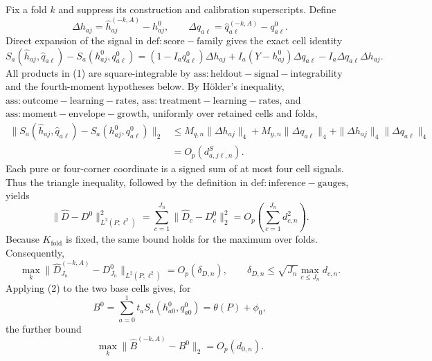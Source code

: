 Fix a fold \(k\) and suppress its construction and calibration superscripts.  Define
\[
 \Delta h_{aj}=\widehat h_{aj}^{(-k,A)}-h^0_{aj},\qquad
 \Delta q_{a\ell}=\widehat q_{a\ell}^{(-k,A)}-q^0_{a\ell}.
\]
Direct expansion of the signal in \(\mathrm{def:score-family}\) gives the exact cell identity
\[
 S_a(\widehat h_{aj},\widehat q_{a\ell})-S_a(h^0_{aj},q^0_{a\ell})
 =(1-I_aq^0_{a\ell})\Delta h_{aj}
 +I_a(Y-h^0_{aj})\Delta q_{a\ell}
 -I_a\Delta q_{a\ell}\Delta h_{aj}.                                      \tag{1}
\]
All products in (1) are square-integrable by \(\mathrm{ass:heldout-signal-integrability}\) and the fourth-moment hypotheses below.  By H\"older's inequality, \(\mathrm{ass:outcome-learning-rates}\), \(\mathrm{ass:treatment-learning-rates}\), and \(\mathrm{ass:moment-envelope-growth}\), uniformly over retained cells and folds,
\[
\begin{aligned}
 \|S_a(\widehat h_{aj},\widehat q_{a\ell})-S_a(h^0_{aj},q^0_{a\ell})\|_2
 &\le M_{q,n}\|\Delta h_{aj}\|_4+M_{y,n}\|\Delta q_{a\ell}\|_4
       +\|\Delta h_{aj}\|_4\|\Delta q_{a\ell}\|_4\\
 &=O_p(d^S_{a,j\ell,n}).                                                    \tag{2}
\end{aligned}
\]
Each pure or four-corner coordinate is a signed sum of at most four cell signals.  Thus the triangle inequality, followed by the definition in \(\mathrm{def:inference-gauges}\), yields
\[
 \|\widehat D-D^0\|_{L^2(P;\ell^2)}^2
 =\sum_{c=1}^{J_n}\|\widehat D_c-D_c^0\|_2^2
 =O_p\!\left(\sum_{c=1}^{J_n}d_{c,n}^2\right).
\]
Because \(K_{\mathrm{fold}}\) is fixed, the same bound holds for the maximum over folds.  Consequently,
\[
 \max_k\|\widehat D_{J_n}^{(-k,A)}-D^0_{J_n}\|_{L^2(P;\ell^2)}
 =O_p(\delta_{D,n}),\qquad
 \delta_{D,n}\le \sqrt{J_n}\max_{c\le J_n}d_{c,n}.                       \tag{3}
\]
Applying (2) to the two base cells gives, for
\[
 B^0=\sum_{a=0}^1t_aS_a(h^0_{a0},q^0_{a0})=\theta(P)+\phi_0,
\]
the further bound
\[
 \max_k\|\widehat B^{(-k,A)}-B^0\|_2=O_p(d_{0,n}).                         \tag{4}
\]

